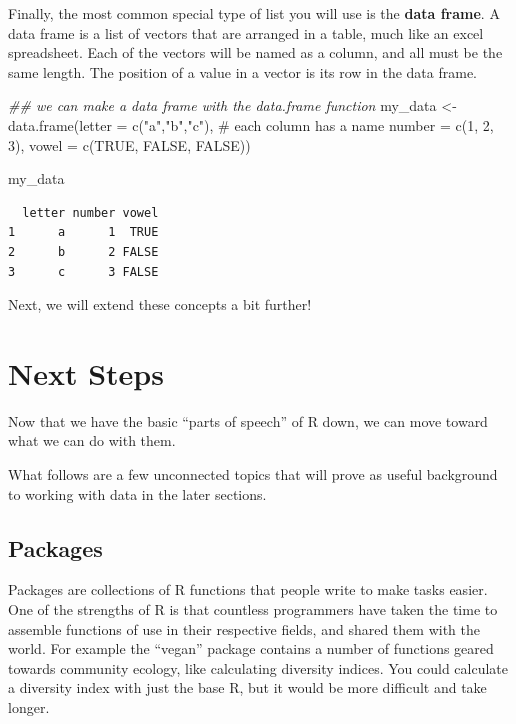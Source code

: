 \documentclass[
  letterpaper,
  DIV=11,
  numbers=noendperiod]{scrreprt}
\newenvironment{Shaded}{\begin{snugshade}}{\end{snugshade}}
\newcommand{\AttributeTok}[1]{\textcolor[rgb]{0.40,0.45,0.13}{#1}}
\newcommand{\CommentTok}[1]{\textcolor[rgb]{0.37,0.37,0.37}{#1}}
\newcommand{\ConstantTok}[1]{\textcolor[rgb]{0.56,0.35,0.01}{#1}}
\newcommand{\DecValTok}[1]{\textcolor[rgb]{0.68,0.00,0.00}{#1}}
\newcommand{\DocumentationTok}[1]{\textcolor[rgb]{0.37,0.37,0.37}{\textit{#1}}}
\newcommand{\FunctionTok}[1]{\textcolor[rgb]{0.28,0.35,0.67}{#1}}
\newcommand{\NormalTok}[1]{\textcolor[rgb]{0.00,0.23,0.31}{#1}}
\newcommand{\OtherTok}[1]{\textcolor[rgb]{0.00,0.23,0.31}{#1}}
\newcommand{\StringTok}[1]{\textcolor[rgb]{0.13,0.47,0.30}{#1}}
\begin{document}
Finally, the most common special type of list you will use is the
\textbf{data frame}. A data frame is a list of vectors that are arranged
in a table, much like an excel spreadsheet. Each of the vectors will be
named as a column, and all must be the same length. The position of a
value in a vector is its row in the data frame.

\begin{Shaded}
\begin{Highlighting}[]
\DocumentationTok{\#\# we can make a data frame with the data.frame function}
\NormalTok{my\_data }\OtherTok{\textless{}{-}} \FunctionTok{data.frame}\NormalTok{(}\AttributeTok{letter =} \FunctionTok{c}\NormalTok{(}\StringTok{"a"}\NormalTok{,}\StringTok{"b"}\NormalTok{,}\StringTok{"c"}\NormalTok{), }\CommentTok{\# each column has a name}
                      \AttributeTok{number =} \FunctionTok{c}\NormalTok{(}\DecValTok{1}\NormalTok{, }\DecValTok{2}\NormalTok{, }\DecValTok{3}\NormalTok{),}
                      \AttributeTok{vowel =} \FunctionTok{c}\NormalTok{(}\ConstantTok{TRUE}\NormalTok{, }\ConstantTok{FALSE}\NormalTok{, }\ConstantTok{FALSE}\NormalTok{))}

\NormalTok{my\_data}
\end{Highlighting}
\end{Shaded}

\begin{verbatim}
  letter number vowel
1      a      1  TRUE
2      b      2 FALSE
3      c      3 FALSE
\end{verbatim}

Next, we will extend these concepts a bit further!

\hypertarget{next-steps}{%
\chapter{Next Steps}\label{next-steps}}

Now that we have the basic ``parts of speech'' of R down, we can move
toward what we can do with them.

What follows are a few unconnected topics that will prove as useful
background to working with data in the later sections.

\hypertarget{packages}{%
\section{Packages}\label{packages}}

Packages are collections of R functions that people write to make tasks
easier. One of the strengths of R is that countless programmers have
taken the time to assemble functions of use in their respective fields,
and shared them with the world. For example the ``vegan'' package
contains a number of functions geared towards community ecology, like
calculating diversity indices. You could calculate a diversity index
with just the base R, but it would be more difficult and take longer.
\end{document}
